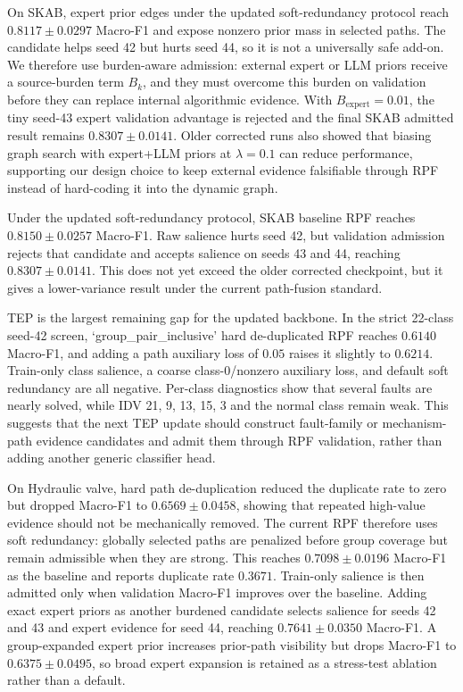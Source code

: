 \documentclass[letterpaper]{article}
\begin{document}
On SKAB, expert prior edges under the updated soft-redundancy protocol reach \(0.8117{\pm}0.0297\) Macro-F1 and expose nonzero prior mass in selected paths. The candidate helps seed 42 but hurts seed 44, so it is not a universally safe add-on. We therefore use burden-aware admission: external expert or LLM priors receive a source-burden term \(B_k\), and they must overcome this burden on validation before they can replace internal algorithmic evidence. With \(B_{\mathrm{expert}}=0.01\), the tiny seed-43 expert validation advantage is rejected and the final SKAB admitted result remains \(0.8307{\pm}0.0141\). Older corrected runs also showed that biasing graph search with expert+LLM priors at \(\lambda=0.1\) can reduce performance, supporting our design choice to keep external evidence falsifiable through RPF instead of hard-coding it into the dynamic graph.

Under the updated soft-redundancy protocol, SKAB baseline RPF reaches \(0.8150{\pm}0.0257\) Macro-F1. Raw salience hurts seed 42, but validation admission rejects that candidate and accepts salience on seeds 43 and 44, reaching \(0.8307{\pm}0.0141\). This does not yet exceed the older corrected checkpoint, but it gives a lower-variance result under the current path-fusion standard.

TEP is the largest remaining gap for the updated backbone. In the strict 22-class seed-42 screen, `group_pair_inclusive' hard de-duplicated RPF reaches \(0.6140\) Macro-F1, and adding a path auxiliary loss of \(0.05\) raises it slightly to \(0.6214\). Train-only class salience, a coarse class-0/nonzero auxiliary loss, and default soft redundancy are all negative. Per-class diagnostics show that several faults are nearly solved, while IDV 21, 9, 13, 15, 3 and the normal class remain weak. This suggests that the next TEP update should construct fault-family or mechanism-path evidence candidates and admit them through RPF validation, rather than adding another generic classifier head.

On Hydraulic valve, hard path de-duplication reduced the duplicate rate to zero but dropped Macro-F1 to \(0.6569{\pm}0.0458\), showing that repeated high-value evidence should not be mechanically removed. The current RPF therefore uses soft redundancy: globally selected paths are penalized before group coverage but remain admissible when they are strong. This reaches \(0.7098{\pm}0.0196\) Macro-F1 as the baseline and reports duplicate rate \(0.3671\). Train-only salience is then admitted only when validation Macro-F1 improves over the baseline. Adding exact expert priors as another burdened candidate selects salience for seeds 42 and 43 and expert evidence for seed 44, reaching \(0.7641{\pm}0.0350\) Macro-F1. A group-expanded expert prior increases prior-path visibility but drops Macro-F1 to \(0.6375{\pm}0.0495\), so broad expert expansion is retained as a stress-test ablation rather than a default.
\end{document}
